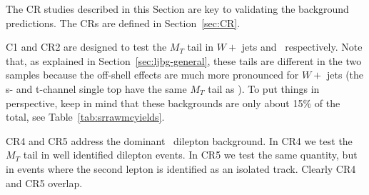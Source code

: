 The CR studies described in this Section are key to validating the
background predictions.  The CRs are defined in Section~\ref{sec:CR}.

C1 and CR2 are designed to test the $M_T$ tail in $W +$ jets and 
\ttbar\ respectively.  Note that, as explained in Section~\ref{sec:ljbg-general},
these tails are different in the two samples because the off-shell effects
are much more pronounced for $W +$ jets (the s- and t-channel single 
top have the same $M_T$ tail as \ttbar).  To put things in perspective, 
keep in mind that these
backgrounds are only about 15\% of the total, see Table~\ref{tab:srrawmcyields}.

CR4 and CR5 address the dominant \ttbar\ dilepton background.
In CR4 we test the $M_T$ tail in well identified dilepton events.
In CR5 we test the same quantity, but in events where the second lepton is identified
as an isolated track.  Clearly CR4 and CR5 overlap.
